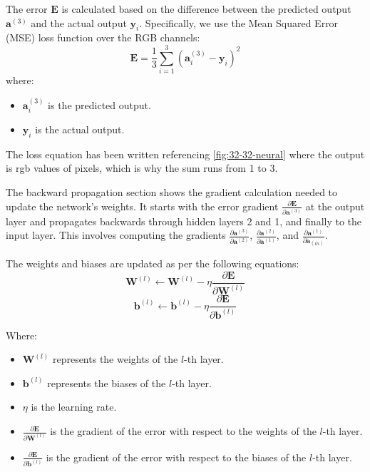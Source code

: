 \documentclass{ioereport}
\begin{document}
The error \( \mathbf{E} \) is calculated based on the difference between the predicted output \( \mathbf{a}^{(3)} \) and the actual output \( \mathbf{y}_i \). Specifically, we use the Mean Squared Error (MSE) loss function over the RGB channels:
\begin{equation}
    \mathbf{E} = \frac{1}{3} \sum_{i=1}^{3} (\mathbf{a}^{(3)}_i - \mathbf{y}_i)^2
\end{equation}
where:
\begin{itemize}
    \item \( \mathbf{a}^{(3)}_i \) is the predicted output.
    \item \( \mathbf{y}_i \) is the actual output.
\end{itemize}
The loss equation has been written referencing \autoref{fig:32-32-neural} where the output is \gls{rgb} values of pixels, which is why the sum runs from 1 to 3.

The backward propagation section shows the gradient calculation needed to update the network's weights. It starts with the error gradient \( \frac{\partial \mathbf{E}}{\partial \mathbf{a}^{(3)}} \) at the output layer and propagates backwards through hidden layers 2 and 1, and finally to the input layer. This involves computing the gradients \( \frac{\partial \mathbf{a}^{(3)}}{\partial \mathbf{a}^{(2)}} \), \( \frac{\partial \mathbf{a}^{(2)}}{\partial \mathbf{a}^{(1)}} \), and \( \frac{\partial \mathbf{a}^{(1)}}{\partial \mathbf{a}_{(in)}} \).

The weights and biases are updated as per the following equations:
\begin{equation}
    \mathbf{W}^{(l)} \leftarrow \mathbf{W}^{(l)} - \eta \frac{\partial \mathbf{E}}{\partial \mathbf{W}^{(l)}}  
\end{equation}
\begin{equation}
    \mathbf{b}^{(l)} \leftarrow \mathbf{b}^{(l)} - \eta \frac{\partial \mathbf{E}}{\partial \mathbf{b}^{(l)}}  
\end{equation}

Where:
\begin{itemize}
    \item \( \mathbf{W}^{(l)} \) represents the weights of the \( l \)-th layer.
    \item \( \mathbf{b}^{(l)} \) represents the biases of the \( l \)-th layer.
    \item \( \eta \) is the learning rate.
    \item \( \frac{\partial \mathbf{E}}{\partial \mathbf{W}^{(l)}} \) is the gradient of the error with respect to the weights of the \( l \)-th layer.
    \item \( \frac{\partial \mathbf{E}}{\partial \mathbf{b}^{(l)}} \) is the gradient of the error with respect to the biases of the \( l \)-th layer.
\end{itemize}
\end{document}
